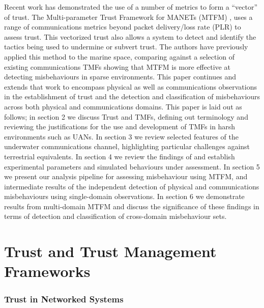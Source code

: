 Recent work has demonstrated the use of a number of metrics to form a ``vector'' of trust. The Multi-parameter Trust Framework for MANETs (MTFM) \cite{Guo11}, uses a range of communications metrics beyond packet delivery/loss rate (PLR) to assess trust. This vectorized trust also allows a system to detect and identify the tactics being used to undermine or subvert trust. The authors have previously applied this method to the marine space, comparing against a selection of existing communications TMFs \cite{Bolster2015b} showing that MTFM is more effective at detecting misbehaviours in sparse environments. This paper continues and extends that work to encompass physical as well as communications observations in the establishment of trust and the detection and classification of misbehaviours across both physical and communications domains. 
This paper is laid out as follows; in section 2 we discuss Trust and TMFs, defining out terminology and reviewing the justifications for the use and development of TMFs in harsh environments such as UANs. In section 3 we review selected features of the underwater communications channel, highlighting particular challenges against terrestrial equivalents. In section 4 we review the findings of \cite{Bolster2015b} and establish experimental parameters and simulated behaviours under assessment. In section 5 we present our analysis pipeline for assessing misbehaviour using MTFM, and intermediate results of the independent detection of physical and communications misbehaviours using single-domain observations. In section 6 we demonstrate results from multi-domain MTFM and discuss the significance of these findings in terms of detection and classification of cross-domain misbehaviour sets.

\section{Trust and Trust Management Frameworks}

\subsubsection{Trust in Networked Systems}

